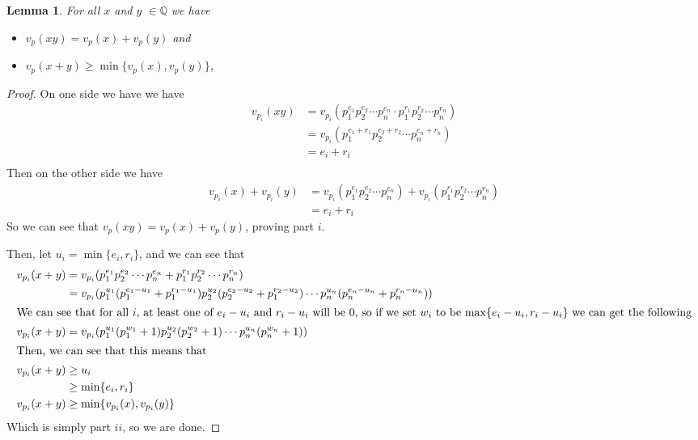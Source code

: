 \documentclass[11pt]{article}
\newtheorem{lemma}[theorem]{Lemma}
\newcommand{\Q}{\mathbb{Q}}
\begin{document}
\begin{lemma}\label{vprops}
  For all $x$ and $y$ $\in \Q$ we have
  \begin{itemize}
    \item [i)] $v_p(xy)=v_p(x)+v_p(y)$ and
    \item [ii)] $v_p(x+y)\geq \min\{v_p(x),v_p(y)\}$,
  \end{itemize}
\end{lemma}
\begin{proof}  On one side we have we have
  \begin{align*}
    v_{p_i}(xy) & = v_{p_i}(p_1^{e_1}p_2^{e_2}\cdots p_n^{e_n}\cdot p_1^{r_1}p_2^{r_2}\cdots p_n^{r_n}) \\
                & = v_{p_i}(p_1^{e_1+r_1}p_2^{e_2+r_2}\cdots p_n^{e_n+r_n})                             \\
                & = e_i+r_i                                                                             \\
  \end{align*}
  Then on the other side we have
  \begin{align*}
    v_{p_i}(x)+v_{p_i}(y) & = v_{p_i}(p_1^{e_1}p_2^{e_2}\cdots p_n^{e_n}) + v_{p_i}(p_1^{r_1}p_2^{r_2}\cdots p_n^{r_n}) \\
                          & = e_i + r_i
  \end{align*}
  So we can see that $v_p(xy)=v_p(x)+v_p(y)$, proving part $i$.

  Then, let $u_i=\min\{e_i,r_i\}$, and we can see that
  \begin{align*}
    v_{p_i}(x+y) & = v_{p_i} (p_1^{e_1}p_2^{e_2}\cdots p_n^{e_n} + p_1^{r_1}p_2^{r_2}\cdots p_n^{r_n})                                                   \\
                 & = v_{p_i} (p_1^{u_1}(p_1^{e_1-u_1}+p_1^{r_1-u_1})p_2^{u_2}(p_2^{e_2-u_2}+p_1^{r_2-u_2})\cdots p_n^{u_n}(p_n^{e_n-u_n}+p_n^{r_n-u_n})) \\
    \intertext{We can see that for all $i$, at least one of $e_i-u_i$ and $r_i-u_i$ will be 0, so if we set $w_i$ to be $\max\{e_i-u_i,r_i-u_i\}$ we can get the following}
    v_{p_i}(x+y) & = v_{p_i} (p_1^{u_1}(p_1^{w_1}+1)p_2^{u_2}(p_2^{w_2}+1)\cdots p_n^{u_n}(p_n^{w_n}+1))                                                 \\
    \intertext{Then, we can see that this means that}
    v_{p_i}(x+y) & \geq u_i                                                                                                                              \\
                 & \geq  \min\{e_i,r_i\}                                                                                                                 \\
    v_{p_i}(x+y) & \geq  \min\{v_{p_i}(x),v_{p_i}(y)\}
  \end{align*}
  Which is simply part $ii$, so we are done.

\end{proof}
\end{document}
